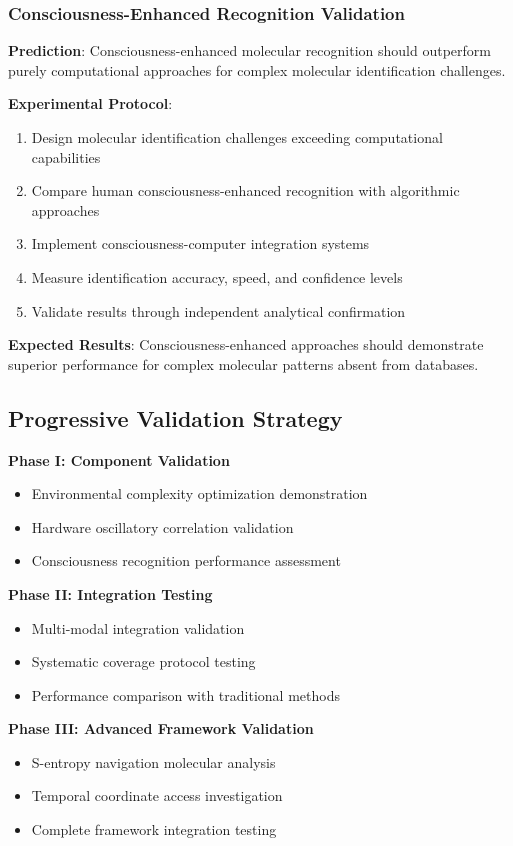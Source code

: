 \documentclass[11pt,a4paper]{article}
\theoremstyle{remark}
\begin{document}
{{{{{{{{{{\subsubsection{Consciousness-Enhanced Recognition Validation}

\textbf{Prediction}: Consciousness-enhanced molecular recognition should outperform purely computational approaches for complex molecular identification challenges.

\textbf{Experimental Protocol}:
\begin{enumerate}
\item Design molecular identification challenges exceeding computational capabilities
\item Compare human consciousness-enhanced recognition with algorithmic approaches
\item Implement consciousness-computer integration systems
\item Measure identification accuracy, speed, and confidence levels
\item Validate results through independent analytical confirmation
\end{enumerate}

\textbf{Expected Results}: Consciousness-enhanced approaches should demonstrate superior performance for complex molecular patterns absent from databases.

\subsection{Progressive Validation Strategy}

\textbf{Phase I: Component Validation}
\begin{itemize}
\item Environmental complexity optimization demonstration
\item Hardware oscillatory correlation validation
\item Consciousness recognition performance assessment
\end{itemize}

\textbf{Phase II: Integration Testing}
\begin{itemize}
\item Multi-modal integration validation
\item Systematic coverage protocol testing
\item Performance comparison with traditional methods
\end{itemize}

\textbf{Phase III: Advanced Framework Validation}
\begin{itemize}
\item S-entropy navigation molecular analysis
\item Temporal coordinate access investigation
\item Complete framework integration testing
\end{itemize}

}}}}}}}}}}
\end{document}

